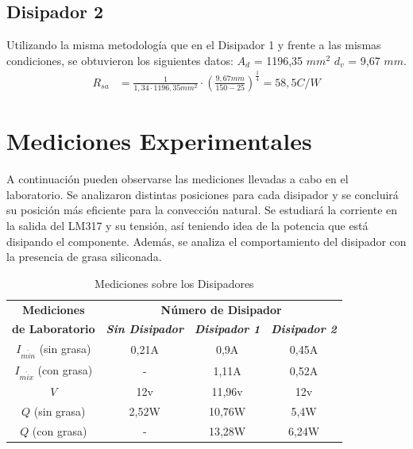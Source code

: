 \documentclass[conference]{IEEEtran}
\begin{document}
\subsection{Disipador 2}
Utilizando la misma metodología que en el Disipador 1 y frente a las mismas condiciones,
se obtuvieron los siguientes datos:
$A_d$ = 1196,35 $mm^2$
$d_v$ = 9,67 $mm$.
\begin{align*}
    R_{sa} &= \frac{1}{1,34\cdot 1196,35mm^2}\cdot \left(\frac{9,67mm}{150-25}\right)^{\frac{1}{4}} = 58,5 C/W
\end{align*}
\section{Mediciones Experimentales}
A continuación pueden observarse las mediciones llevadas a cabo en el laboratorio. Se analizaron
distintas posiciones para cada disipador y se concluirá su posición más eficiente para la convección
natural. Se estudiará la corriente en la salida del LM317 y su tensión, así teniendo idea de la potencia
que está disipando el componente. Además, se analiza el comportamiento del disipador con la presencia 
de grasa siliconada.

\begin{table}[htbp]
    \caption{Mediciones sobre los Disipadores}
    \begin{center}
    \begin{tabular}{|c|c|c|c|}
    \hline
    \textbf{Mediciones} & \multicolumn{3}{|c|}{\textbf{Número de Disipador}} \\
    \cline{2-4} 
    \textbf{de Laboratorio} & \textbf{\textit{Sin Disipador}} & \textbf{\textit{Disipador 1}} & \textbf{\textit{Disipador 2}} \\
    \hline
    $I_{m\acute{i}n}$ (sin grasa) & 0,21A & 0,9A & 0,45A \\
    \hline
    $I_{m\acute{i}x}$ (con grasa) & - & 1,11A & 0,52A \\
    \hline
    $V$ & 12v & 11,96v & 12v \\
    \hline
    $Q$ (sin grasa) & 2,52W & 10,76W & 5,4W \\
    \hline
    $Q$ (con grasa) & - & 13,28W & 6,24W \\
    \hline
    \end{tabular}
    \label{tab1}
    \end{center}
    \end{table}
\end{document}
